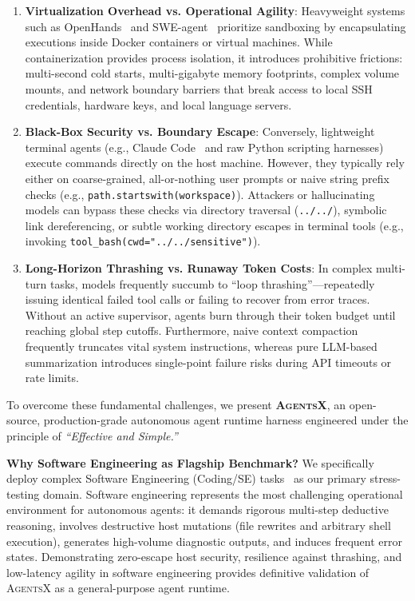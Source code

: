 \documentclass[10pt,twocolumn,letterpaper]{article}
\begin{document}
\begin{enumerate}
    \item \textbf{Virtualization Overhead vs. Operational Agility}: Heavyweight systems such as OpenHands~\cite{openhands2024} and SWE-agent~\cite{yang2024sweagent} prioritize sandboxing by encapsulating executions inside Docker containers or virtual machines. While containerization provides process isolation, it introduces prohibitive frictions: multi-second cold starts, multi-gigabyte memory footprints, complex volume mounts, and network boundary barriers that break access to local SSH credentials, hardware keys, and local language servers.
    \item \textbf{Black-Box Security vs. Boundary Escape}: Conversely, lightweight terminal agents (e.g., Claude Code~\cite{anthropic2024claudecode} and raw Python scripting harnesses) execute commands directly on the host machine. However, they typically rely either on coarse-grained, all-or-nothing user prompts or naive string prefix checks (e.g., \texttt{path.startswith(workspace)}). Attackers or hallucinating models can bypass these checks via directory traversal (\texttt{../../}), symbolic link dereferencing, or subtle working directory escapes in terminal tools (e.g., invoking \texttt{tool\_bash(cwd="../../sensitive")}).
    \item \textbf{Long-Horizon Thrashing vs. Runaway Token Costs}: In complex multi-turn tasks, models frequently succumb to ``loop thrashing''---repeatedly issuing identical failed tool calls or failing to recover from error traces. Without an active supervisor, agents burn through their token budget until reaching global step cutoffs. Furthermore, naive context compaction frequently truncates vital system instructions, whereas pure LLM-based summarization introduces single-point failure risks during API timeouts or rate limits.
\end{enumerate}

To overcome these fundamental challenges, we present \textbf{\textsc{AgentsX}}, an open-source, production-grade autonomous agent runtime harness engineered under the principle of \emph{``Effective and Simple.''} 

\noindent\textbf{Why Software Engineering as Flagship Benchmark?} We specifically deploy complex Software Engineering (Coding/SE) tasks~\cite{jimenez2024swebench} as our primary stress-testing domain. Software engineering represents the most challenging operational environment for autonomous agents: it demands rigorous multi-step deductive reasoning, involves destructive host mutations (file rewrites and arbitrary shell execution), generates high-volume diagnostic outputs, and induces frequent error states. Demonstrating zero-escape host security, resilience against thrashing, and low-latency agility in software engineering provides definitive validation of \textsc{AgentsX} as a general-purpose agent runtime.
\end{document}
